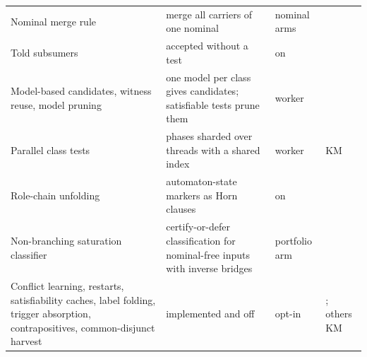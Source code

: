 \begin{small}
\begin{longtable}{@{}p{}p{}p{}p{}@{}}
Nominal merge rule & merge all carriers of one nominal & nominal arms & \cite{horrocks2007shoiq}\\
Told subsumers & accepted without a test & on & \cite{baader1994empirical}\\
Model-based candidates, witness reuse, model pruning & one model per class gives candidates; satisfiable tests prune them & worker & \cite{glimm2012novel}\\
Parallel class tests & phases sharded over threads with a shared index & worker & KM\\
Role-chain unfolding & automaton-state markers as Horn clauses & on & \cite{horrocks2006sroiq}\\
Non-branching saturation classifier & certify-or-defer classification for nominal-free inputs with inverse bridges & portfolio arm & \cite{glimm2012novel,steigmiller2014coupling}\\
Conflict learning, restarts, satisfiability caches, label folding, trigger absorption, contrapositives, common-disjunct harvest & implemented and off & opt-in & \cite{marquessilva1999grasp,luby1993optimal,horrocks1999optimizing,horrocks2000axioms}; others KM\\
\bottomrule
\end{longtable}
\end{small}

